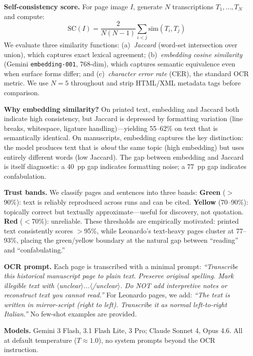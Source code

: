 \documentclass[10pt,twocolumn]{article}
\begin{document}
\textbf{Self-consistency score.} For page image $I$, generate $N$ transcriptions $T_1,\ldots,T_N$ and compute:
$$\textrm{SC}(I) = \frac{2}{N(N{-}1)} \sum_{i<j} \textrm{sim}(T_i, T_j)$$
We evaluate three similarity functions: (a)~\emph{Jaccard} (word-set intersection over union), which captures exact lexical agreement; (b)~\emph{embedding cosine similarity} (Gemini \texttt{embedding-001}, 768-dim), which captures semantic equivalence even when surface forms differ; and (c)~\emph{character error rate} (CER), the standard OCR metric. We use $N{=}5$ throughout and strip HTML/XML metadata tags before comparison.

\textbf{Why embedding similarity?} On printed text, embedding and Jaccard both indicate high consistency, but Jaccard is depressed by formatting variation (line breaks, whitespace, ligature handling)---yielding 55--62\% on text that is semantically identical. On manuscripts, embedding captures the key distinction: the model produces text that is \emph{about} the same topic (high embedding) but uses entirely different words (low Jaccard). The gap between embedding and Jaccard is itself diagnostic: a 40~pp gap indicates formatting noise; a 77~pp gap indicates confabulation.

\textbf{Trust bands.} We classify pages and sentences into three bands: \textcolor{green!50!black}{\textbf{Green}} ($>$90\%): text is reliably reproduced across runs and can be cited. \textcolor{orange!70!black}{\textbf{Yellow}} (70--90\%): topically correct but textually approximate---useful for discovery, not quotation. \textcolor{red!60!black}{\textbf{Red}} ($<$70\%): unreliable. These thresholds are empirically motivated: printed text consistently scores $>$95\%, while Leonardo's text-heavy pages cluster at 77--93\%, placing the green/yellow boundary at the natural gap between ``reading'' and ``confabulating.''

\textbf{OCR prompt.} Each page is transcribed with a minimal prompt: \emph{``Transcribe this historical manuscript page to plain text. Preserve original spelling. Mark illegible text with $\langle$unclear$\rangle$...$\langle$/unclear$\rangle$. Do NOT add interpretive notes or reconstruct text you cannot read.''} For Leonardo pages, we add: \emph{``The text is written in mirror-script (right to left). Transcribe it as normal left-to-right Italian.''} No few-shot examples are provided.

\textbf{Models.} Gemini 3 Flash, 3.1 Flash Lite, 3 Pro; Claude Sonnet 4, Opus 4.6. All at default temperature ($T{\approx}1.0$), no system prompts beyond the OCR instruction.
\end{document}
